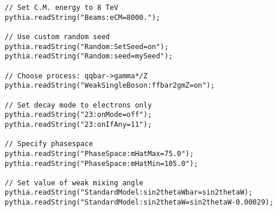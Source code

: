 \lstset{language=C++}
\begin{small}
\begin{lstlisting}[frame=single]
// Set C.M. energy to 8 TeV
pythia.readString("Beams:eCM=8000.");

// Use custom random seed
pythia.readString("Random:SetSeed=on");
pythia.readString("Random:seed=mySeed");

// Choose process: qqbar->gamma*/Z
pythia.readString("WeakSingleBoson:ffbar2gmZ=on");

// Set decay mode to electrons only
pythia.readString("23:onMode=off");
pythia.readString("23:onIfAny=11");

// Specify phasespace
pythia.readString("PhaseSpace:mHatMax=75.0");
pythia.readString("PhaseSpace:mHatMin=105.0");

// Set value of weak mixing angle
pythia.readString("StandardModel:sin2thetaWbar=sin2thetaW);
pythia.readString("StandardModel:sin2thetaW=sin2thetaW-0.00029);
\end{lstlisting}
\end{small}
